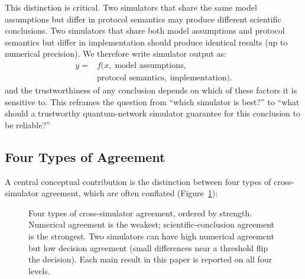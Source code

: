 \documentclass[aps,prapplied,reprint,superscriptaddress]{revtex4-2}
\begin{document}
This distinction is critical. Two simulators that share the same model assumptions but differ in protocol semantics may produce different scientific conclusions. Two simulators that share both model assumptions and protocol semantics but differ in implementation should produce identical results (up to numerical precision). We therefore write simulator output as:
\begin{equation}
\begin{aligned}
y ={}& f(x,\; \text{model assumptions},\\
      & \text{protocol semantics},\; \text{implementation}).
\end{aligned}
\end{equation}
and the trustworthiness of any conclusion depends on which of these factors it is sensitive to. This reframes the question from ``which simulator is best?'' to ``what should a trustworthy quantum-network simulator guarantee for this conclusion to be reliable?''

\subsection{Four Types of Agreement}
\label{sec:four_agreement}

A central conceptual contribution is the distinction between four types of cross-simulator agreement, which are often conflated (Figure~\ref{fig:agreement}):

\begin{figure}[t]
\centering
{}
\caption{Four types of cross-simulator agreement, ordered by strength. Numerical agreement is the weakest; scientific-conclusion agreement is the strongest. Two simulators can have high numerical agreement but low decision agreement (small differences near a threshold flip the decision). Each main result in this paper is reported on all four levels.}
\label{fig:agreement}
\end{figure}
\end{document}
